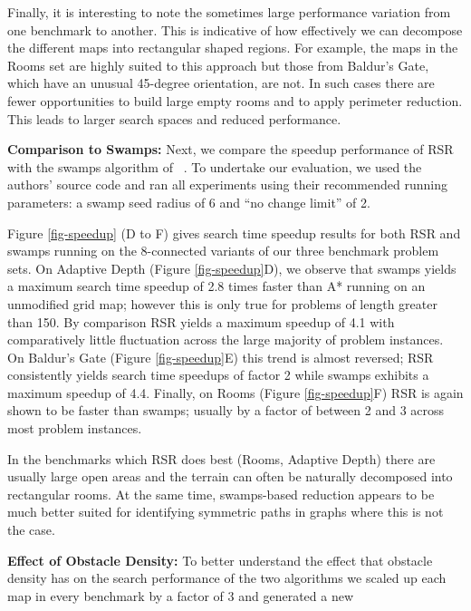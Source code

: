Finally, it is interesting to note the sometimes large performance variation 
from one benchmark to another. This is indicative of how effectively we can 
decompose the different maps into rectangular shaped regions.
For example, the maps in the Rooms set are highly suited to this approach but those
from Baldur's Gate, which have an unusual 45-degree orientation, are not.
In such cases there are fewer opportunities to build large empty rooms and to apply perimeter reduction.
This leads to larger search spaces and reduced performance. 
\par
\textbf{Comparison to Swamps:}
Next, we compare the speedup performance of RSR with the swamps algorithm
of \citeauthor{pochter10}~.
To undertake our evaluation, we used the authors' source code and ran all experiments 
using their recommended running parameters:
a swamp seed radius of 6 and ``no change limit'' of 2.
\par
Figure \ref{fig-speedup} (D to F) gives search time speedup results for both 
RSR and swamps running on the 8-connected variants of our three benchmark 
problem sets. 
On Adaptive Depth (Figure \ref{fig-speedup}D), we observe that 
swamps yields a maximum search time speedup of 2.8 times faster than 
 A* running on an unmodified grid map; however this is only true for problems of length greater than 150.
By comparison RSR yields a maximum speedup of 4.1 with comparatively little fluctuation across the
large majority of problem instances.
On Baldur's Gate (Figure \ref{fig-speedup}E) this trend is almost reversed; RSR consistently 
yields search time speedups of factor 2 while swamps exhibits a maximum speedup of 4.4.
Finally, on Rooms (Figure \ref{fig-speedup}F) RSR is again shown to be faster than swamps;
usually by a factor of between 2 and 3 across most problem instances.
\par
In the benchmarks which RSR does best (Rooms, Adaptive Depth) 
there are usually large open areas and the terrain can often be naturally decomposed into rectangular rooms.
At the same time, swamps-based reduction appears to be much better suited for identifying symmetric paths 
in graphs where this is not the case.
\par
\textbf{Effect of Obstacle Density:}
To better understand the effect that obstacle density has on the search performance of the two algorithms
we scaled up each map in every benchmark by a factor of 3 and generated a new

